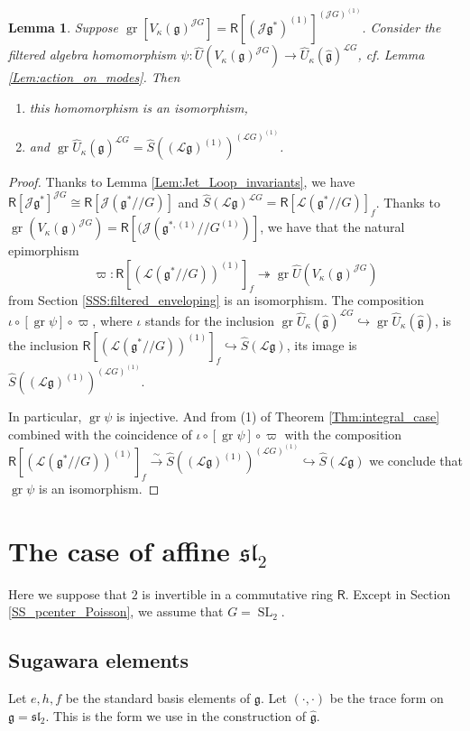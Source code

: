 \documentclass{amsart}
\newtheorem{Lem}[Thm]{Lemma}
\theoremstyle{definition}
\newcommand{\slf}{\mathfrak{sl}}
\newcommand{\Ring}{\mathsf{R}}
\newcommand{\g}{\mathfrak{g}}
\newcommand{\hg}{\hat{\mathfrak{g}}}
\newcommand{\gr}{\operatorname{gr}}
\newcommand{\Jet}{\mathscr{J}}
\newcommand{\Loop}{\mathscr{L}}
\numberwithin{equation}{section}
\begin{document}
\begin{Lem}\label{Lem:center_assoc_grad} Suppose $\gr [V_\kappa(\g)^{\Jet G}]= \Ring[(\Jet \g^*)^{(1)}]^{(\Jet G)^{(1)}}$. Consider the filtered algebra homomorphism
$\psi:\widehat{U}(V_\kappa(\g)^{\Jet G})\rightarrow  \widehat{U}_\kappa(\hg)^{\Loop G}$, cf. Lemma \ref{Lem:action_on_modes}. Then 
\begin{enumerate} 
\item this homomorphism is an isomorphism, 
\item and $\gr \widehat{U}_\kappa(\hg)^{\Loop G}=  \widehat{S}((\Loop \g)^{(1)})^{(\Loop G)^{(1)}}$.  
\end{enumerate}
\end{Lem}
\begin{proof}
Thanks to  Lemma \ref{Lem:Jet_Loop_invariants}, we have $\Ring[\Jet \g^*]^{\Jet G}\cong \Ring[\Jet (\g^*/\!/G)]$ and $\widehat{S}(\Loop \g)^{\Loop G}=\Ring[\Loop(\g^*/\!/G)]_f$. Thanks to 
$\gr (V_\kappa(\g)^{\Jet G})= \Ring[(\Jet (\g^{*,(1)}/\!/G^{(1)})]$, we have that the natural epimorphism
$$\varpi:\Ring[(\Loop (\g^*/\!/G))^{(1)}]_f\twoheadrightarrow \gr\widehat{U}\left(V_\kappa(\g)^{\Jet G}\right)$$
from Section \ref{SSS:filtered_enveloping} is an isomorphism.
The composition $\iota\circ [\gr\psi]\circ \varpi$, where $\iota$ stands for the inclusion   $\gr\widehat{U}_\kappa(\hg)^{\Loop G}\hookrightarrow \gr \widehat{U}_\kappa(\hg)$, is the inclusion 
$\Ring[(\Loop (\g^*/\!/G))^{(1)}]_f\hookrightarrow  \widehat{S}(\Loop \g)$, its image is  $\widehat{S}\left((\Loop \g)^{(1)}\right)^{(\Loop G)^{(1)}}$.

In particular, $\gr\psi$ is injective. And from (1) of Theorem \ref{Thm:integral_case} combined with the coincidence of $\iota\circ [\gr\psi]\circ \varpi$ with the composition $\Ring[(\Loop (\g^*/\!/G))^{(1)}]_f\xrightarrow{\sim} \widehat{S}\left((\Loop \g)^{(1)}\right)^{(\Loop G)^{(1)}}\hookrightarrow  \widehat{S}(\Loop \g)$ we conclude that $\gr\psi$ is an isomorphism.
\end{proof}

\section{The case of affine ${\slf}_2$}\label{S_sl2}
Here we suppose that $2$ is invertible in a commutative ring $\Ring$. Except in Section \ref{SS_pcenter_Poisson}, we assume that $G=\operatorname{SL}_2$.

\subsection{Sugawara elements}
Let $e,h,f$ be the standard basis elements of $\g$. 
Let $(\cdot,\cdot)$ be the trace form on $\g=\slf_2$.
This is the form we use in the construction of $\hat{\g}$. 
\end{document}
